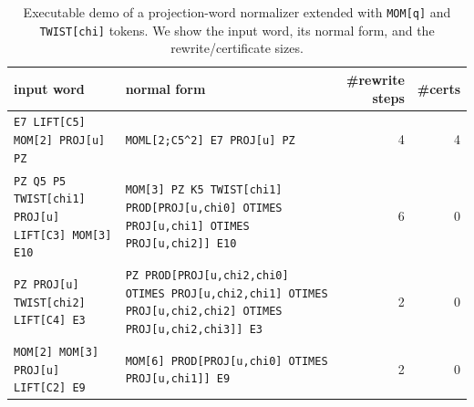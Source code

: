 \begin{table}[H]
\centering
\scriptsize
\setlength{\tabcolsep}{6pt}
\caption{Executable demo of a projection-word normalizer extended with \texttt{MOM[q]} and \texttt{TWIST[chi]} tokens. We show the input word, its normal form, and the rewrite/certificate sizes.}
\label{tab:pom_projword_mom_twist_normalizer_demo}
\begin{tabular}{l l r r}
\toprule
input word & normal form & \#rewrite steps & \#certs\\
\midrule
\texttt{E7 LIFT[C5] MOM[2] PROJ[u] PZ} & \texttt{MOML[2;C5\^{}2] E7 PROJ[u] PZ} & 4 & 4\\
\texttt{PZ Q5 P5 TWIST[chi1] PROJ[u] LIFT[C3] MOM[3] E10} & \texttt{MOM[3] PZ K5 TWIST[chi1] PROD[PROJ[u,chi0] OTIMES PROJ[u,chi1] OTIMES PROJ[u,chi2]] E10} & 6 & 0\\
\texttt{PZ PROJ[u] TWIST[chi2] LIFT[C4] E3} & \texttt{PZ PROD[PROJ[u,chi2,chi0] OTIMES PROJ[u,chi2,chi1] OTIMES PROJ[u,chi2,chi2] OTIMES PROJ[u,chi2,chi3]] E3} & 2 & 0\\
\texttt{MOM[2] MOM[3] PROJ[u] LIFT[C2] E9} & \texttt{MOM[6] PROD[PROJ[u,chi0] OTIMES PROJ[u,chi1]] E9} & 2 & 0\\
\bottomrule
\end{tabular}
\end{table}
